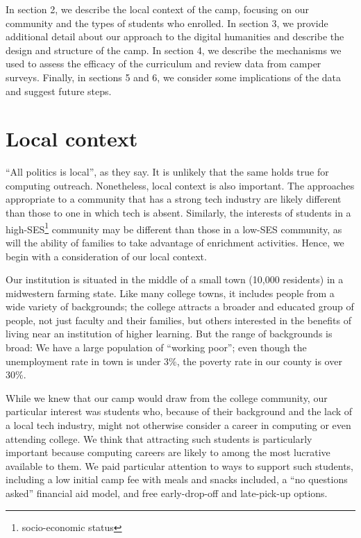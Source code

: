 In section 2, we describe the local context of the camp, focusing
on our community and the types of students who enrolled.  In section
3, we provide additional detail about our approach to the digital
humanities and describe the design and structure of the camp.  In
section 4, we describe the mechanisms we used to assess the efficacy
of the curriculum and review data from camper surveys.  Finally,
in sections 5 and 6, we consider some implications of the data and
suggest future steps.

\section{Local context}

``All politics is local'', as they say.  It is unlikely that the
same holds true for computing outreach.  Nonetheless, local context
is also important.  The approaches appropriate to a community that
has a strong tech industry are likely different than those to one
in which tech is absent.  Similarly, the interests of students in
a high-SES\footnote{socio-economic status} community may be different
than those in a low-SES community, as will the ability of families
to take advantage of enrichment activities.  Hence, we begin with a
consideration of our local context.

Our institution is situated in the middle of a small town (10,000
residents) in a midwestern farming state.  Like many college towns,
it includes people from a wide variety of backgrounds; the college
attracts a broader and educated group of people, not just faculty
and their families, but others interested in the benefits of living
near an institution of higher learning.  But the range of backgrounds
is broad: We have a large population of ``working poor''; even
though the unemployment rate in town is under 3\%, the poverty rate
in our county is over 30\%.

While we knew that our camp would draw from the college community,
our particular interest was students who, because of their background
and the lack of a local tech industry, might not otherwise consider
a career in computing or even attending college.  We think that
attracting such students is particularly important because computing
careers are likely to among the most lucrative available to them.
We paid particular attention to ways to support such students,
including a low initial camp fee with meals and snacks included, a
``no questions asked'' financial aid model, and free early-drop-off
and late-pick-up options.

